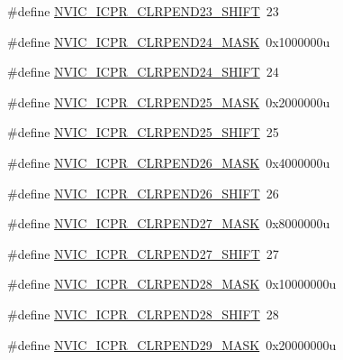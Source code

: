 \begin{DoxyCompactItemize}
\item 
\#define \hyperlink{group___n_v_i_c___register___masks_ga0db3b5547705baa260e90b4af6fba4e6}{N\+V\+I\+C\+\_\+\+I\+C\+P\+R\+\_\+\+C\+L\+R\+P\+E\+N\+D23\+\_\+\+S\+H\+I\+FT}~23
\item 
\#define \hyperlink{group___n_v_i_c___register___masks_gad39d3479ec277667d39901e03be03549}{N\+V\+I\+C\+\_\+\+I\+C\+P\+R\+\_\+\+C\+L\+R\+P\+E\+N\+D24\+\_\+\+M\+A\+SK}~0x1000000u
\item 
\#define \hyperlink{group___n_v_i_c___register___masks_ga6f9300a78809d286be3f5cefcec11d1a}{N\+V\+I\+C\+\_\+\+I\+C\+P\+R\+\_\+\+C\+L\+R\+P\+E\+N\+D24\+\_\+\+S\+H\+I\+FT}~24
\item 
\#define \hyperlink{group___n_v_i_c___register___masks_ga9a87841546e02b3663c176acc675e487}{N\+V\+I\+C\+\_\+\+I\+C\+P\+R\+\_\+\+C\+L\+R\+P\+E\+N\+D25\+\_\+\+M\+A\+SK}~0x2000000u
\item 
\#define \hyperlink{group___n_v_i_c___register___masks_ga536c723e540866816f6d880e2d584885}{N\+V\+I\+C\+\_\+\+I\+C\+P\+R\+\_\+\+C\+L\+R\+P\+E\+N\+D25\+\_\+\+S\+H\+I\+FT}~25
\item 
\#define \hyperlink{group___n_v_i_c___register___masks_ga9e51fcc3ff6e7fcaf81ecbef7707e20c}{N\+V\+I\+C\+\_\+\+I\+C\+P\+R\+\_\+\+C\+L\+R\+P\+E\+N\+D26\+\_\+\+M\+A\+SK}~0x4000000u
\item 
\#define \hyperlink{group___n_v_i_c___register___masks_ga657bd2af6a0f6582089c1a97885c483d}{N\+V\+I\+C\+\_\+\+I\+C\+P\+R\+\_\+\+C\+L\+R\+P\+E\+N\+D26\+\_\+\+S\+H\+I\+FT}~26
\item 
\#define \hyperlink{group___n_v_i_c___register___masks_ga0178c55b7023bc98079d5453a8459f5c}{N\+V\+I\+C\+\_\+\+I\+C\+P\+R\+\_\+\+C\+L\+R\+P\+E\+N\+D27\+\_\+\+M\+A\+SK}~0x8000000u
\item 
\#define \hyperlink{group___n_v_i_c___register___masks_gaa75d4162cb20140c58c7e6a9a6cd244e}{N\+V\+I\+C\+\_\+\+I\+C\+P\+R\+\_\+\+C\+L\+R\+P\+E\+N\+D27\+\_\+\+S\+H\+I\+FT}~27
\item 
\#define \hyperlink{group___n_v_i_c___register___masks_ga056bf976f30a1a25cd15632ad8bea77a}{N\+V\+I\+C\+\_\+\+I\+C\+P\+R\+\_\+\+C\+L\+R\+P\+E\+N\+D28\+\_\+\+M\+A\+SK}~0x10000000u
\item 
\#define \hyperlink{group___n_v_i_c___register___masks_ga3408d12a544213de0a51da980b630103}{N\+V\+I\+C\+\_\+\+I\+C\+P\+R\+\_\+\+C\+L\+R\+P\+E\+N\+D28\+\_\+\+S\+H\+I\+FT}~28
\item 
\#define \hyperlink{group___n_v_i_c___register___masks_gad26492cb22f95a48d13ba9f63af51482}{N\+V\+I\+C\+\_\+\+I\+C\+P\+R\+\_\+\+C\+L\+R\+P\+E\+N\+D29\+\_\+\+M\+A\+SK}~0x20000000u

\end{DoxyCompactItemize}

